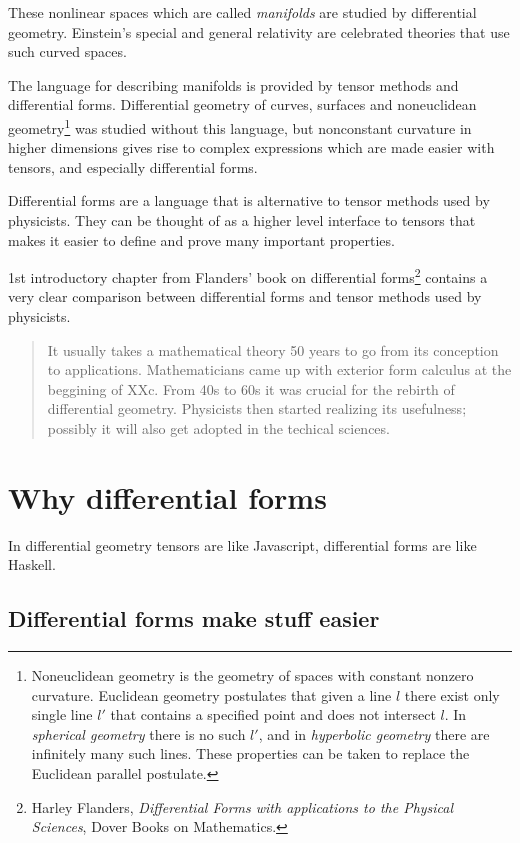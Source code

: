 \documentclass[11pt]{article}
\begin{document}
These nonlinear spaces which are called \emph{manifolds} are studied by differential geometry.
Einstein's special and general relativity are celebrated theories that use such curved spaces.

The language for describing manifolds is provided by tensor methods and differential forms. Differential geometry of curves, surfaces and noneuclidean geometry\footnote{Noneuclidean geometry is the geometry of spaces with constant nonzero curvature. Euclidean geometry postulates that given a line \(l\) there exist only single line \(l'\) that contains a specified point and does not intersect \(l\). In \emph{spherical geometry} there is no such \(l'\), and in \emph{hyperbolic geometry} there are infinitely many such lines. These properties can be taken to replace the Euclidean parallel postulate.} was studied without this language, but nonconstant curvature in higher dimensions gives rise to complex expressions which are made easier with tensors, and especially differential forms.

Differential forms are a language that is alternative to tensor methods used by physicists. They can be thought of as a higher level interface to tensors that makes it easier to define and prove many important properties.

1st introductory chapter from Flanders' book on differential forms\footnote{Harley Flanders, \emph{Differential Forms with applications to the Physical Sciences}, Dover Books on Mathematics.} contains a very clear comparison between differential forms and tensor methods used by physicists.

\begin{quote}
It usually takes a mathematical theory 50 years to go from its conception to applications. Mathematicians came up with exterior form calculus at the beggining of XXc. From 40s to 60s it was crucial for the rebirth of differential geometry. Physicists then started realizing its usefulness; possibly it will also get adopted in the techical sciences.
\end{quote}

\section{Why differential forms}
\label{sec:org237bfeb}

In differential geometry tensors are like Javascript, differential forms are like Haskell.

\subsection{Differential forms make stuff easier}
\label{sec:orgf29de6e}
\end{document}
